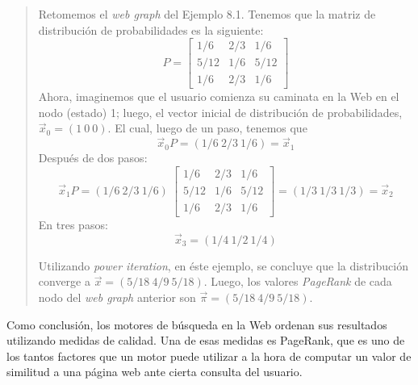 			\begin{quote}
				Retomemos el \textit{web graph} del Ejemplo 8.1. Tenemos que la matriz de distribución de probabilidades es la siguiente:
				\[
				P =
				\begin{bmatrix}
					1/6 & 2/3 & 1/6 \\
					5/12 & 1/6 & 5/12 \\
					1/6 & 2/3 & 1/6
				\end{bmatrix}
				\]
				Ahora, imaginemos que el usuario comienza su caminata en la Web en el nodo (estado) 1; luego, el vector inicial de distribución de probabilidades, $\vec{x}_0 = (1 \ 0 \ 0)$. El cual, luego de un paso, tenemos que
				\begin{equation}
					\vec{x}_0 P = (1/6 \ 2/3 \ 1/6) = \vec{x}_1
				\end{equation}
				Después de dos pasos:
				\begin{equation}
					\vec{x}_1 P = (1/6 \ 2/3 \ 1/6) \ \begin{bmatrix}
														1/6 & 2/3 & 1/6 \\
														5/12 & 1/6 & 5/12 \\
														1/6 & 2/3 & 1/6	
													\end{bmatrix} = (1/3 \ 1/3 \ 1/3) = \vec{x}_2
				\end{equation}
				En tres pasos:
				\begin{equation}
					\vec{x}_3 = (1/4 \ 1/2 \ 1/4)
				\end{equation}
				
				Utilizando \textit{power iteration}, en éste ejemplo, se concluye que la distribución converge a $\vec{x} = (5/18 \ 4/9 \ 5/18)$. Luego, los valores \textit{PageRank} de cada nodo del \textit{web graph} anterior son $\vec{\pi} = (5/18 \ 4/9 \ 5/18)$.
			\end{quote}
			
			Como conclusión, los motores de búsqueda en la Web ordenan sus resultados utilizando medidas de calidad. Una de esas medidas es PageRank, que es uno de los tantos factores que un motor puede utilizar a la hora de computar un valor de similitud a una página web ante cierta consulta del usuario.